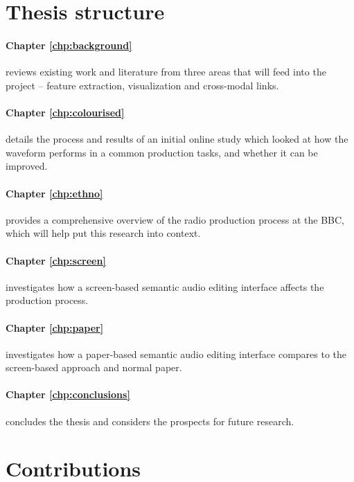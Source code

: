 \section{Thesis structure}\label{sec:intro/structure}

\paragraph{Chapter \ref{chp:background}} reviews existing work and literature
from three areas that will feed into the project -- feature extraction,
visualization and cross-modal links.

\paragraph{Chapter \ref{chp:colourised}} details the process and results of an
initial online study which looked at how the waveform performs in a common
production tasks, and whether it can be improved.

\paragraph{Chapter \ref{chp:ethno}} provides a comprehensive overview of
the radio production process at the BBC, which will help put this research into
context.

\paragraph{Chapter \ref{chp:screen}} investigates how a screen-based semantic audio editing interface affects the
production process.

\paragraph{Chapter \ref{chp:paper}} investigates how a paper-based semantic audio editing interface compares to
the screen-based approach and normal paper.

\paragraph{Chapter \ref{chp:conclusions}} concludes the thesis and considers the prospects for future research.

\section{Contributions}\label{sec:intro-contributions}


